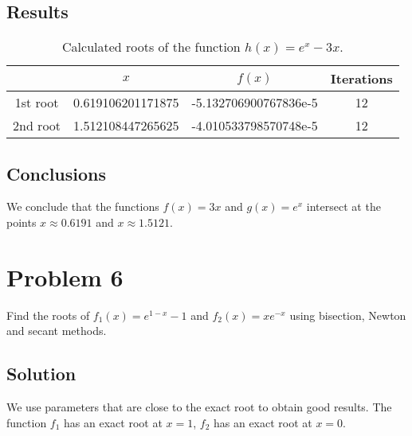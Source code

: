 \documentclass[12pt, a4paper]{article}
\begin{document}
\subsection{Results}
\begin{table}[H]
\centering
\begin{tabular}{@{}cccc@{}}
\toprule
         & $x$               & $f(x)$                & Iterations \\ \midrule
1st root & 0.619106201171875 & -5.132706900767836e-5 & 12         \\ \midrule
2nd root & 1.512108447265625 & -4.010533798570748e-5 & 12         \\ \bottomrule
\end{tabular}
\caption{Calculated roots of the function $h(x) = e^x - 3x$.}
\label{tab:ex5}
\end{table}

\subsection{Conclusions}
We conclude that the functions $f(x) = 3x$ and $g(x) = e^x$ intersect at the
points $x \approx 0.6191$ and $x \approx 1.5121$.

\section{Problem 6}
Find the roots of $f_1(x) = e^{1-x} - 1$ and $f_2(x) = xe^{-x}$ using bisection, Newton and secant methods.

\subsection{Solution}
We use parameters that are close to the exact root to obtain good results. The
function $f_1$ has an exact root at $x = 1$, $f_2$ has an exact root at $x = 0$.
\end{document}
